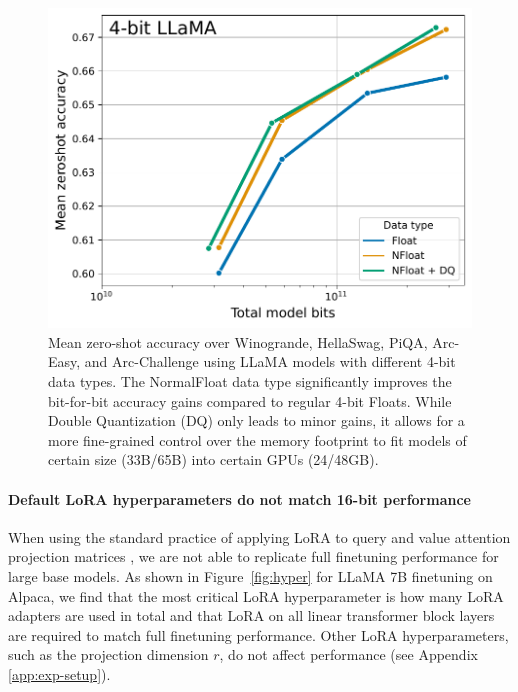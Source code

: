 \documentclass{article}
\begin{document}
\begin{figure}
\centering
         \includegraphics[scale=0.42]{figures/4bit_llama.pdf}
        \caption{Mean zero-shot accuracy over Winogrande, HellaSwag, PiQA, Arc-Easy, and Arc-Challenge using LLaMA models with different 4-bit data types. 
        The NormalFloat data type significantly improves the bit-for-bit accuracy gains compared to regular 4-bit Floats. While Double Quantization (DQ) only leads to minor gains, it allows for a more fine-grained control over the memory footprint to fit models of certain size (33B/65B) into certain GPUs (24/48GB).
        \vspace{-10pt}
        }
        \label{fig:nf4}
\end{figure}

\paragraph{Default LoRA hyperparameters do not match 16-bit performance} 
When using the standard practice of applying LoRA to query and value attention projection matrices \citep{hu2021lora}, we are not able to replicate full finetuning performance for large base models.
As shown in Figure~\ref{fig:hyper} for LLaMA 7B finetuning on Alpaca, we find that the most critical LoRA hyperparameter is how many LoRA adapters are used in total and that LoRA on all linear transformer block layers are required to match full finetuning performance. Other LoRA hyperparameters, such as the projection dimension $r$, do not affect performance (see Appendix \ref{app:exp-setup}). 
\end{document}
